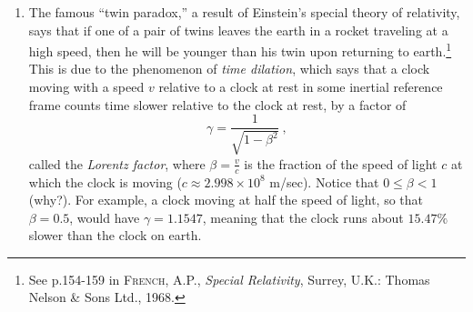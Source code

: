 {\begin{enumerate}[\bfseries 1.]
[{[\bfseries 1.]}]
 \item The famous ``twin paradox,'' a result of Einstein's special theory of
 relativity, says that if one of a pair of twins leaves the earth in a rocket
 traveling at a high speed, then he will be younger than his twin upon
 returning to earth.\footnote{See p.154-159 in \textsc{French, A.P.},
 \emph{Special Relativity}, Surrey, U.K.: Thomas Nelson \& Sons Ltd., 1968.}
 This is due to the phenomenon of \emph{time dilation}, which says that a clock
 moving with a speed $v$ relative to a clock at rest in some inertial reference
 frame counts time slower relative to the clock at rest, by a factor
 of
 \begin{displaymath}
  \gamma = \dfrac{1}{\sqrt{1 - \beta^2}} ~,
 \end{displaymath}
 called the \emph{Lorentz factor}, where
 $\beta = \frac{v}{c}$ is the fraction of the speed of light $c$ at which the
 clock is moving ($c \approx 2.998 \times 10^8$ m/sec). Notice that
 $0 \le \beta < 1$ (why?). For example, a clock moving at half the speed of
 light, so that $\beta = 0.5$, would have $\gamma = 1.1547$, meaning that the
 clock runs about $15.47\%$ slower than the clock on earth.

\end{enumerate}}
